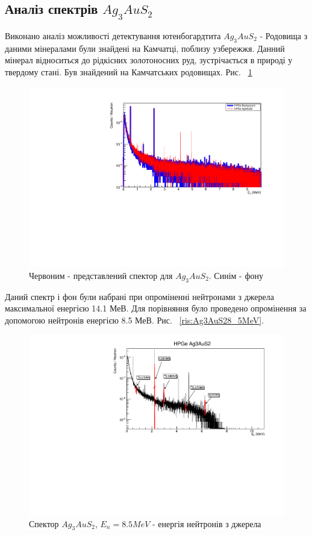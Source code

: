 \documentclass[a4paper, 14pt]{article}
\numberwithin{equation}{section}
\numberwithin{table}{section}
\begin{document}
\subsection{Аналіз спектрів $Ag_3AuS_2$}
Виконано аналіз можливості детектування ютенбогардтита $Ag_3AuS_2$ - Родовища з даними мінералами були знайдені на Камчатці, поблизу узбережжя. Данний мінерал відноситься до рідкісних золотоносних руд, зустрічається в природі у твердому стані. Був знайдений на Камчатських родовищах. Рис. ~\ref{ris:Ag3AuS2Fon}		
\begin{figure}[hbt!]
	\centering \includegraphics[width=1\textwidth]{res/auFonAllLog.pdf}
	\caption{Червоним - представлений спектор для $Ag_3AuS_2$. Синім - фону} 
	\label{ris:Ag3AuS2Fon}	
\end{figure} 	
Даний спектр і фон були набрані при опроміненні нейтронами з джерела максимальної енергією 14.1 МеВ.
Для порівняння було проведено опромінення за допомогою нейтронів енергією 8.5 МеВ. Рис. ~\ref{ris:Ag3AuS28_5MeV}.
\begin{figure}[hbt!]
	\centering \includegraphics[width=1\textwidth]{res/AgAuSsenst.pdf}
	\caption{Спектор $Ag_3AuS_2$, $E_{n} = 8.5 MeV$ - енергія нейтронів з джерела}
	\label{ris:Ag3AuS28_5MeVPick}	
\end{figure} 
\end{document}

